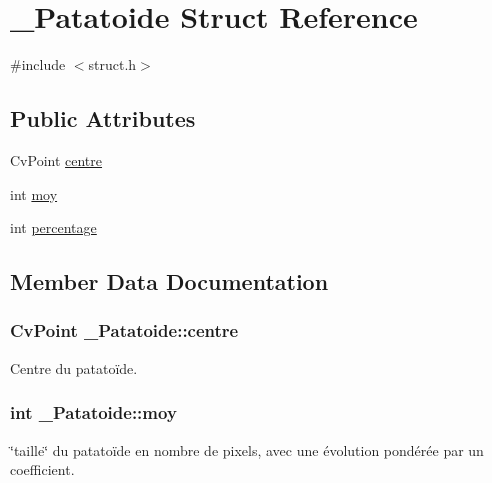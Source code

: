 \hypertarget{struct___patatoide}{}\section{\+\_\+\+Patatoide Struct Reference}
\label{struct___patatoide}


{\ttfamily \#include $<$struct.\+h$>$}

\subsection*{Public Attributes}
\begin{DoxyCompactItemize}
\item 
Cv\+Point \hyperlink{struct___patatoide_af09e794797d7eff23275a6415334c7d3}{centre}
\item 
int \hyperlink{struct___patatoide_a3de9938e002e44bf1c395af4811dc048}{moy}
\item 
int \hyperlink{struct___patatoide_a3154bc1cd89cedada3ad78fe9f69c23d}{percentage}
\end{DoxyCompactItemize}


\subsection{Member Data Documentation}
\subsubsection[{\texorpdfstring{centre}{centre}}]{\setlength{\rightskip}{0pt plus 5cm}Cv\+Point \+\_\+\+Patatoide\+::centre}\hypertarget{struct___patatoide_af09e794797d7eff23275a6415334c7d3}{}\label{struct___patatoide_af09e794797d7eff23275a6415334c7d3}
Centre du patatoïde. 
\subsubsection[{\texorpdfstring{moy}{moy}}]{\setlength{\rightskip}{0pt plus 5cm}int \+\_\+\+Patatoide\+::moy}\hypertarget{struct___patatoide_a3de9938e002e44bf1c395af4811dc048}{}\label{struct___patatoide_a3de9938e002e44bf1c395af4811dc048}
\char`\"{}taille\char`\"{} du patatoïde en nombre de pixels, avec une évolution pondérée par un coefficient. 
